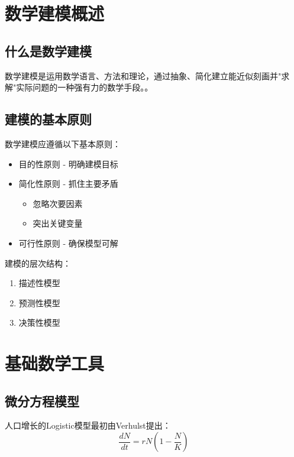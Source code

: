 \documentclass[../main]{subfiles}
\begin{document}
\section{数学建模概述}

\subsection{什么是数学建模}
数学建模是运用数学语言、方法和理论，通过抽象、简化建立能近似刻画并"求解"实际问题的一种强有力的数学手段\autocite{giordano2013mathematical}。。


\subsection{建模的基本原则}
数学建模应遵循以下基本原则\autocite{meerschaert2013mathematical}：
\begin{itemize}
    \item 目的性原则 - 明确建模目标
    \item 简化性原则 - 抓住主要矛盾
        \begin{itemize}
            \item 忽略次要因素
            \item 突出关键变量
        \end{itemize}
    \item 可行性原则 - 确保模型可解
\end{itemize}

建模的层次结构：
\begin{enumerate}[label=(\arabic*)]
    \item 描述性模型
    \item 预测性模型
    \item 决策性模型
\end{enumerate}

\section{基础数学工具}

\subsection{微分方程模型}
人口增长的Logistic模型最初由Verhulst提出\autocite{verhulst1838notice}：
\begin{equation}\label{eq:logistic}
    \frac{dN}{dt} = rN\left(1-\frac{N}{K}\right)
\end{equation}
\end{document}
